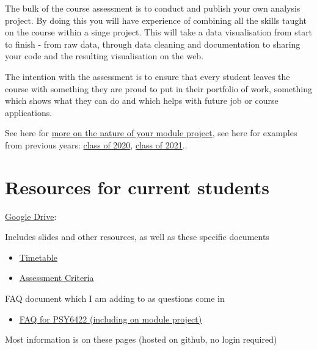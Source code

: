 \documentclass[
]{book}
\providecommand{\tightlist}{%
  \setlength{\itemsep}{0pt}\setlength{\parskip}{0pt}}
\begin{document}
The bulk of the course assessment is to conduct and publish your own analysis project. By doing this you will have experience of combining all the skills taught on the course within a singe project. This will take a data visualisation from start to finish - from raw data, through data cleaning and documentation to sharing your code and the resulting visualisation on the web.

The intention with the assessment is to ensure that every student leaves the course with something they are proud to put in their portfolio of work, something which shows what they can do and which helps with future job or course applications.

See here for \href{module-project.html}{more on the nature of your module project}, see here for examples from previous years: \href{class-of-2020.html}{class of 2020}, \href{class-of-2021.html}{class of 2021}..

\hypertarget{resources-for-current-students}{%
\section{Resources for current students}\label{resources-for-current-students}}

\href{https://drive.google.com/drive/folders/1sDmbrTfKpiz2Y02R17ajLPkJV1XSxvJD?usp=sharing}{Google Drive}:

Includes slides and other resources, as well as these specific documents

\begin{itemize}
\tightlist
\item
  \href{https://docs.google.com/spreadsheets/d/1YBbaaFursDBg-aGvJ32WJd-IinPM7oml-tPMnVZIEA0/edit?usp=sharing}{Timetable}
\item
  \href{https://docs.google.com/spreadsheets/d/1oTJKI675ijCs14jUoT9d_8yPH2i_S2AfQG507jN8aVY/edit?usp=sharing}{Assessment Criteria}
\end{itemize}

FAQ document which I am adding to as questions come in

\begin{itemize}
\tightlist
\item
  \href{https://docs.google.com/document/d/11OQs5bTnqth_cxwjHbQNeJTWZdp-wSTUcCQ2Uoz5rFw/edit?usp=sharing}{FAQ for PSY6422 (including on module project)}
\end{itemize}

Most information is on these pages (hosted on github, no login required)
\end{document}

